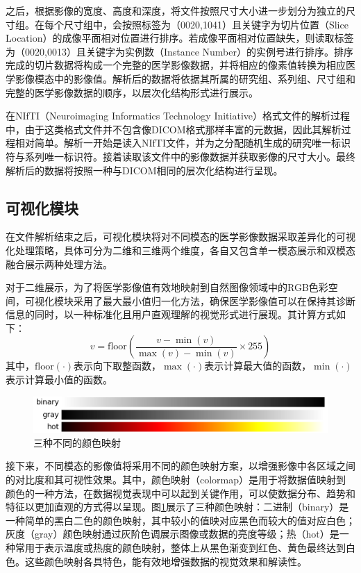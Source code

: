 之后，根据影像的宽度、高度和深度，将文件按照尺寸大小进一步划分为独立的尺寸组。在每个尺寸组中，会按照标签为（0020,1041）且关键字为切片位置（Slice Location）的成像平面相对位置进行排序。若成像平面相对位置缺失，则读取标签为（0020,0013）且关键字为实例数（Instance Number）的实例号进行排序。排序完成的切片数据将构成一个完整的医学影像数据，并将相应的像素值转换为相应医学影像模态中的影像值。解析后的数据将依据其所属的研究组、系列组、尺寸组和完整的医学影像数据的顺序，以层次化结构形式进行展示。

在NIfTI（Neuroimaging Informatics Technology Initiative）格式文件的解析过程中，由于这类格式文件并不包含像DICOM格式那样丰富的元数据，因此其解析过程相对简单。解析一开始是读入NIfTI文件，并为之分配随机生成的研究唯一标识符与系列唯一标识符。接着读取该文件中的影像数据并获取影像的尺寸大小。最终解析后的数据将按照一种与DICOM相同的层次化结构进行呈现。

\subsection{可视化模块}

在文件解析结束之后，可视化模块将对不同模态的医学影像数据采取差异化的可视化处理策略，具体可分为二维和三维两个维度，各自又包含单一模态展示和双模态融合展示两种处理方法。

对于二维展示，为了将医学影像值有效地映射到自然图像领域中的RGB色彩空间，可视化模块采用了最大最小值归一化方法，确保医学影像值可以在保持其诊断信息的同时，以一种标准化且用户直观理解的视觉形式进行展现。其计算方式如下：
\begin{equation}
    v =\text{floor}(\frac{v - \min(v)}{\max(v) - \min(v)} \times 255)
    \label{eq:chap05_min_max}
\end{equation}
其中，\(\text{floor}(\cdot)\)表示向下取整函数，\(\max(\cdot)\)表示计算最大值的函数，\(\min(\cdot)\)表示计算最小值的函数。

\begin{figure}[htbp]
    \centering
    \includegraphics[width=\textwidth]{figures/chap05_colormap.png}
    \caption{三种不同的颜色映射}
    \label{fig:chap05_colormap}
\end{figure}

接下来，不同模态的影像值将采用不同的颜色映射方案，以增强影像中各区域之间的对比度和其可视性效果。其中，颜色映射（colormap）是用于将数据值映射到颜色的一种方法，在数据视觉表现中可以起到关键作用，可以使数据分布、趋势和特征以更加直观的方式得以呈现。图\ref{fig:chap05_colormap}展示了三种颜色映射：二进制（binary）是一种简单的黑白二色的颜色映射，其中较小的值映对应黑色而较大的值对应白色；灰度（gray）颜色映射通过灰阶色调展示图像或数据的亮度等级；热（hot）是一种常用于表示温度或热度的颜色映射，整体上从黑色渐变到红色、黄色最终达到白色。这些颜色映射各具特色，能有效地增强数据的视觉效果和解读性。

